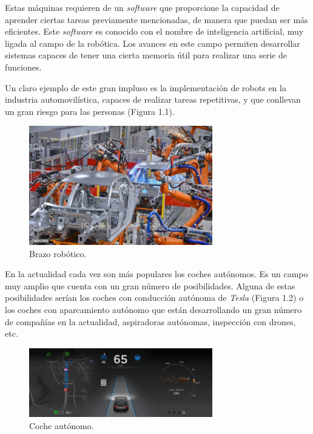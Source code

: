 \documentclass[a4paper, 12pt]{book}
\begin{document}

Estas máquinas requieren de un \emph{software} que proporcione la capacidad de aprender ciertas tareas previamente mencionadas, de manera que puedan ser más eficientes. Este \emph{software} es conocido con el nombre de inteligencia artificial, muy ligada al campo de la robótica. Los avances en este campo permiten desarrollar sistemas capaces de tener una cierta memoria útil para realizar una serie de funciones.


Un claro ejemplo de este gran impluso es la implementación de robots en la industria automovilística, capaces de realizar tareas repetitivas, y que conllevan un gran riesgo para las personas (Figura 1.1).


\begin{figure}[H]
	\centering
    \includegraphics[width=8cm, keepaspectratio]{img/brazo}
    \caption{Brazo robótico.}
    \label{figura:brazo_robotico}
\end{figure}

En la actualidad cada vez son más populares los coches autónomos. Es un campo muy amplio que cuenta con un gran número de posibilidades. Alguna de estas posibilidades serían los coches con conducción autónoma de \textit{Tesla}  (Figura 1.2) o los coches con aparcamiento autónomo que están desarrollando un gran número de compañías en la actualidad, aspiradoras autónomas, inspección con drones, etc.

\begin{figure}[H]
	\centering
    \includegraphics[width=8cm, keepaspectratio]{img/coche}
    \caption{Coche autónomo.}
    \label{figura:coche_autonomo}
\end{figure}
\end{document}
